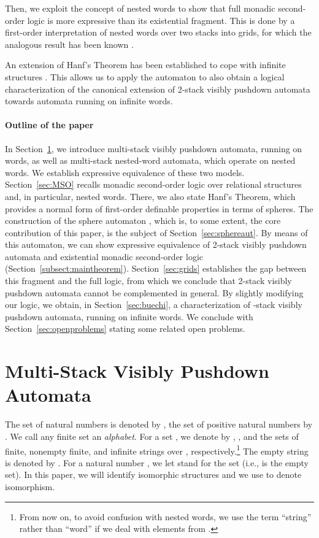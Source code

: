 \documentclass{LMCS}
\begin{document}
Then, we exploit the concept of nested words to show that full monadic
second-order logic is more expressive than its existential fragment. This is
done by a first-order interpretation of nested words over two stacks into
grids, for which the analogous result has been known \cite{MST02}.

An extension of Hanf's Theorem has been established to cope with infinite
structures \cite{LSV:06:11}. This allows us to apply the automaton
 to also obtain a logical characterization of the canonical
extension of 2-stack visibly pushdown automata towards \Buchi automata running
on infinite words.

\paragraph{Outline of the paper} In Section~\ref{sec:MVPA}, we introduce
multi-stack visibly pushdown automata, running on words, as well as
multi-stack nested-word automata, which operate on nested words. We establish
expressive equivalence of these two models. Section~\ref{sec:MSO} recalls
monadic second-order logic over relational structures and, in particular,
nested words. There, we also state Hanf's Theorem, which provides a normal
form of first-order definable properties in terms of spheres. The construction
of the sphere automaton , which is, to some extent, the core
contribution of this paper, is the subject of Section~\ref{sec:sphereaut}. By
means of this automaton, we can show expressive equivalence of 2-stack visibly
pushdown automata and existential monadic second-order logic
(Section~\ref{subsect:maintheorem}). Section~\ref{sec:grids} establishes the
gap between this fragment and the full logic, from which we conclude that
2-stack visibly pushdown automata cannot be complemented in general. By
slightly modifying our logic, we obtain, in Section~\ref{sec:buechi}, a
characterization of -stack visibly pushdown automata, running on
infinite words. We conclude with Section~\ref{sec:openproblems} stating some
related open problems.




\section{Multi-Stack Visibly Pushdown Automata}\label{sec:MVPA}

The set  of natural numbers is denoted by , the set
 of positive natural numbers by . We call any finite
set an \emph{alphabet}. For a set , we denote by ,
, and  the sets of finite, nonempty finite, and
infinite strings over , respectively.\footnote{From now on, to avoid
  confusion with nested words, we use the term ``string'' rather than ``word''
  if we deal with elements from .} The empty
string is denoted by . For a natural number , we let
 stand for the set  (i.e.,  is the empty set). In
this paper, we will identify isomorphic structures and we use  to
denote isomorphism.
\end{document}
